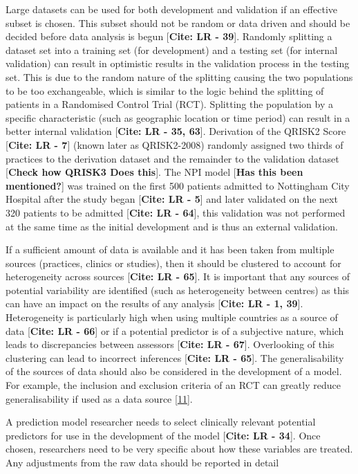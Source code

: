 \documentclass[12pt,PhD,twoside,openright]{muthesis}
\begin{document}
Large datasets can be used for both development and validation if an effective subset is chosen. This subset should not be random or data driven and should be decided before data analysis is begun {[}\textbf{Cite: LR - 39}{]}. Randomly splitting a dataset set into a training set (for development) and a testing set (for internal validation) can result in optimistic results in the validation process in the testing set. This is due to the random nature of the splitting causing the two populations to be too exchangeable, which is similar to the logic behind the splitting of patients in a Randomised Control Trial (RCT). Splitting the population by a specific characteristic (such as geographic location or time period) can result in a better internal validation {[}\textbf{Cite: LR - 35, 63}{]}. Derivation of the QRISK2 Score {[}\textbf{Cite: LR - 7}{]} (known later as QRISK2-2008) randomly assigned two thirds of practices to the derivation dataset and the remainder to the validation dataset {[}\textbf{Check how QRISK3 Does this}{]}. The NPI model {[}\textbf{Has this been mentioned?}{]} was trained on the first 500 patients admitted to Nottingham City Hospital after the study began {[}\textbf{Cite: LR - 5}{]} and later validated on the next 320 patients to be admitted {[}\textbf{Cite: LR - 64}{]}, this validation was not performed at the same time as the initial development and is thus an external validation.

If a sufficient amount of data is available and it has been taken from multiple sources (practices, clinics or studies), then it should be clustered to account for heterogeneity across sources {[}\textbf{Cite: LR - 65}{]}. It is important that any sources of potential variability are identified (such as heterogeneity between centres) as this can have an impact on the results of any analysis {[}\textbf{Cite: LR - 1, 39}{]}. Heterogeneity is particularly high when using multiple countries as a source of data {[}\textbf{Cite: LR - 66}{]} or if a potential predictor is of a subjective nature, which leads to discrepancies between assessors {[}\textbf{Cite: LR - 67}{]}. Overlooking of this clustering can lead to incorrect inferences {[}\textbf{Cite: LR - 65}{]}. The generalisability of the sources of data should also be considered in the development of a model. For example, the inclusion and exclusion criteria of an RCT can greatly reduce generalisability if used as a data source {[}\protect\hyperlink{ref-moons_prognosis_2009}{11}{]}.

A prediction model researcher needs to select clinically relevant potential predictors for use in the development of the model {[}\textbf{Cite: LR - 34}{]}. Once chosen, researchers need to be very specific about how these variables are treated. Any adjustments from the raw data should be reported in detail
\end{document}
